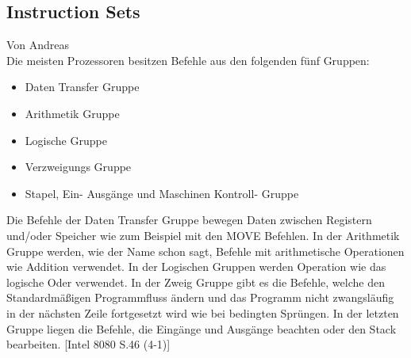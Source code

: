 \documentclass[12pt]{article}
\begin{document}
\subsection{Instruction Sets}
Von Andreas\\
Die meisten Prozessoren besitzen Befehle aus den folgenden fünf Gruppen:
\begin{itemize}
\item Daten Transfer Gruppe
\item Arithmetik Gruppe
\item Logische Gruppe
\item Verzweigungs Gruppe
\item Stapel, Ein- Ausgänge und Maschinen Kontroll- Gruppe
\end{itemize}\noindent
Die Befehle der Daten Transfer Gruppe bewegen Daten zwischen Registern und/oder Speicher wie zum Beispiel mit den MOVE Befehlen. In der Arithmetik Gruppe werden, wie der Name schon sagt, Befehle mit arithmetische Operationen wie Addition verwendet. In der Logischen Gruppen werden Operation wie das logische Oder verwendet. In der Zweig Gruppe gibt es die Befehle, welche den Standardmäßigen Programmfluss ändern und das Programm nicht zwangsläufig in der nächsten Zeile fortgesetzt wird wie bei bedingten Sprüngen. In der letzten Gruppe liegen die Befehle, die Eingänge und Ausgänge beachten oder den Stack bearbeiten. [Intel 8080 S.46 (4-1)]
\\

\newpage
\end{document}
